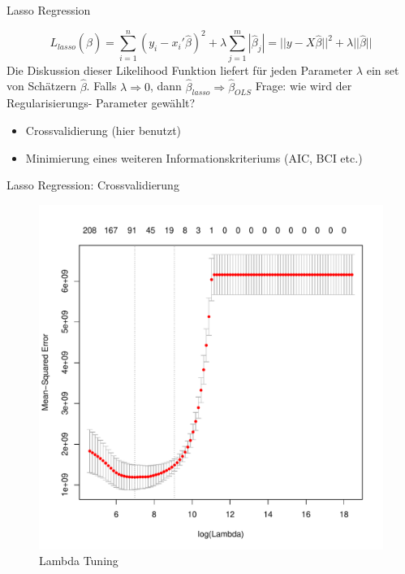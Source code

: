 \documentclass[10pt]{beamer}
\begin{document}
\begin{frame}{Lasso Regression}
	
	\begin{equation*}
	L_{lasso}(\hat{\beta})=\sum_{i=1}^{n}(y_{i}-x_{i}'\hat{\beta})^2+\lambda\sum_{j=1}^{m}|\hat{\beta}_{j}|=||y-X\hat{\beta}||^2+\lambda||\hat{\beta}||
	\end{equation*}
	Die Diskussion dieser Likelihood Funktion liefert für jeden Parameter $\lambda$ ein set von Schätzern $\hat{\beta}$.
	Falls $\lambda \Rightarrow 0$, dann $\hat{\beta}_{lasso} \Rightarrow \hat{\beta}_{OLS}$
	Frage: wie wird der Regularisierungs- Parameter gewählt?
	\begin{itemize}
		\item Crossvalidierung (hier benutzt)
		\item Minimierung eines weiteren Informationskriteriums (AIC, BCI etc.)
	\end{itemize}
	
\end{frame}

\begin{frame}{Lasso Regression: Crossvalidierung}
	
	\begin{figure}
		\centering
		\includegraphics[height=.7\textheight]{figures/lasso_cv.pdf}
		\caption{Lambda Tuning}
	\end{figure}
	
\end{frame}
\end{document}

